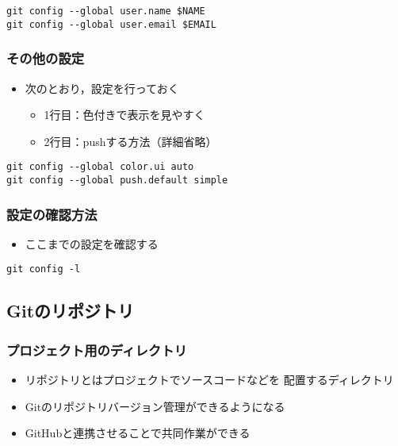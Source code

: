 \documentclass[a4paper,twoside,twocolumn]{bxjsarticle}
\begin{document}
\begin{verbatim}
git config --global user.name $NAME
git config --global user.email $EMAIL
\end{verbatim}

\subsubsection{その他の設定}
\label{sec-1-1-4}
\begin{itemize}
\item 次のとおり，設定を行っておく
\begin{itemize}
\item 1行目：色付きで表示を見やすく
\item 2行目：pushする方法（詳細省略）
\end{itemize}
\end{itemize}

\begin{verbatim}
git config --global color.ui auto
git config --global push.default simple
\end{verbatim}

\subsubsection{設定の確認方法}
\label{sec-1-1-5}
\begin{itemize}
\item ここまでの設定を確認する
\end{itemize}

\begin{verbatim}
git config -l
\end{verbatim}

\subsection{Gitのリポジトリ}
\label{sec-1-2}
\subsubsection{プロジェクト用のディレクトリ}
\label{sec-1-2-1}
\begin{itemize}
\item リポジトリとはプロジェクトでソースコードなどを
配置するディレクトリ
\item Gitのリポジトリバージョン管理ができるようになる
\item GitHubと連携させることで共同作業ができる
\end{itemize}
\end{document}
